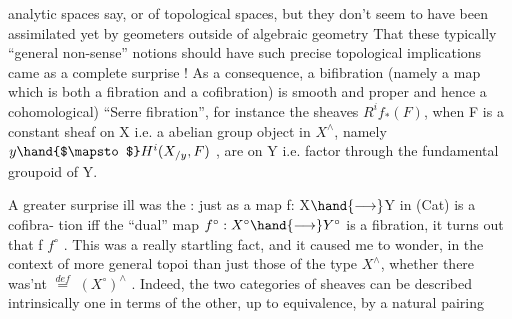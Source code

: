 analytic spaces say, or of topological spaces, but they don't seem to
have been assimilated yet by geometers outside of algebraic geometry\hand{)}
That these typically ``general non-sense'' notions should have such precise
topological implications came as a complete surprise ! As a consequence,
a bifibration (namely a map which is both a fibration and a cofibration)
is smooth and proper and hence a \hand{(}cohomological) ``Serre fibration'', for
instance the sheaves $R^{i}f_{*}(F)$, when F is a constant  sheaf on X \hand{(}i.e. a
 abelian group object in $X^{\wedge}$\hand{)}, namely $y\hand{$\mapsto$}H^{i}(X_{/y},F)$ , are \hand{\uline{\textcolor{black}{local}}} \hand{\uline{\textcolor{black}{systems}}} 
on Y i.e. factor through the fundamental groupoid of Y. \unsure{*}

A  greater surprise ill was the \hand{\uline{\textcolor{black}{duality between the notions of
properness and smoothness}}}: just as a map f: X$\hand{\longrightarrow}$Y in (Cat) is a cofibra-%
tion iff the ``dual'' map $f^{\circ}: X^{\circ}\hand{\longrightarrow}Y^{\circ}$ is a fibration, it turns out that
f \hand{\uline{\textcolor{black}{is proper iff}}} $f^{\circ}$ \hand{\uline{\textcolor{black}{is smooth}}}. This was a really startling fact, and it
caused me to wonder, in the context of more general topoi than just those
of the type $X^{\wedge}$, whether there was'nt \hand{\uline{\textcolor{black}{a notion of duality generalizing}}}
  $\overset{def}{=}$ $(X^{\circ})^{\wedge}$ . Indeed, the
two categories of sheaves can be described intrinsically one in terms of
the other, up to equivalence, by a natural pairing

